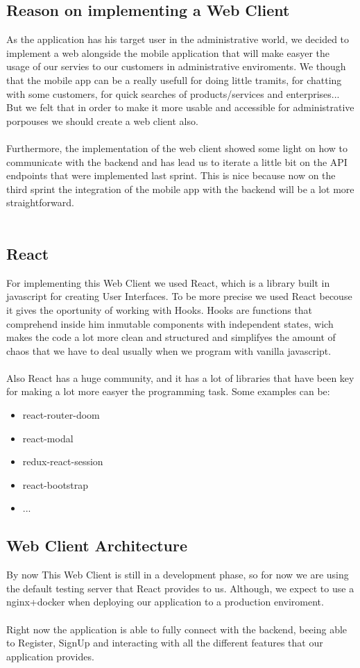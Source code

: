 \documentclass[./main.tex]{subfiles}
\begin{document}
\subsection{Reason on implementing a Web Client}
As the application has his target user in the 
administrative world, we decided to implement 
a web alongside the mobile application that will
make easyer the usage of our servies to our customers
in administrative enviroments. We though that the 
mobile app can be a really usefull for doing little 
tramits, for chatting with some customers, for 
quick searches of products/services and enterprises...\\
But we felt that in order to make it more usable and
accessible for administrative porpouses we should
create a web client also.
\\\\
Furthermore, the implementation of the web client 
showed some light on how to communicate with the backend
and has lead us to iterate a little bit on the API endpoints
that were implemented last sprint. This is nice because now
on the third sprint the integration of the mobile app with the 
backend will be a lot more straightforward.
\\\\
\subsection{React}
For implementing this Web Client we used React, which is a 
library built in javascript for creating User Interfaces. 
To be more precise we used React becouse it gives the oportunity
of working with Hooks. Hooks are functions that comprehend inside him inmutable
components with independent states, wich makes the code a lot more
clean and structured and simplifyes the amount of chaos that we have
to deal usually when we program with vanilla javascript.
\\\\
Also React has a huge community, and it has a lot of libraries that
have been key for making a lot more easyer the programming task.
Some examples can be:
\begin{itemize}
	\item react-router-doom
	\item react-modal
	\item redux-react-session
	\item react-bootstrap
	\item ...
\end{itemize}
\subsection{Web Client Architecture}
By now This Web Client is still in a development phase, so for 
now we are using the default testing server that React provides to us.
Although, we expect to use a nginx+docker when deploying our application
to a production enviroment.
\\\\
Right now the application is able to fully connect with the backend,
beeing able to Register, SignUp and interacting with all the different 
features that our application provides.
\end{document}
